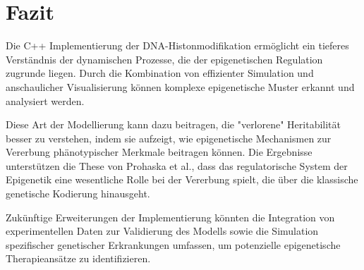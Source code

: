 \documentclass{SeminarV2}
\begin{document}
\section{Fazit}
Die C++ Implementierung der DNA-Histonmodifikation erm{\"o}glicht ein tieferes Verst{\"a}ndnis der dynamischen Prozesse, die der epigenetischen Regulation zugrunde liegen. Durch die Kombination von effizienter Simulation und anschaulicher Visualisierung k{\"o}nnen komplexe epigenetische Muster erkannt und analysiert werden.

Diese Art der Modellierung kann dazu beitragen, die "verlorene" Heritabilit{\"a}t besser zu verstehen, indem sie aufzeigt, wie epigenetische Mechanismen zur Vererbung ph{\"a}notypischer Merkmale beitragen k{\"o}nnen. Die Ergebnisse unterst{\"u}tzen die These von Prohaska et al., dass das regulatorische System der Epigenetik eine wesentliche Rolle bei der Vererbung spielt, die {\"u}ber die klassische genetische Kodierung hinausgeht.

Zuk{\"u}nftige Erweiterungen der Implementierung k{\"o}nnten die Integration von experimentellen Daten zur Validierung des Modells sowie die Simulation spezifischer genetischer Erkrankungen umfassen, um potenzielle epigenetische Therapieans{\"a}tze zu identifizieren.

\begin{footnotesize}
\newpage


\end{footnotesize}
\end{document}
